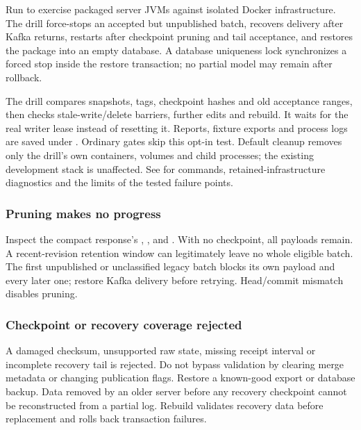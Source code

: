 Run  to exercise packaged server
JVMs against isolated Docker infrastructure. The drill force-stops an accepted
but unpublished batch, recovers delivery after Kafka returns, restarts after
checkpoint pruning and tail acceptance, and restores the package into an empty
database. A database uniqueness lock synchronizes a forced stop inside the
restore transaction; no partial model may remain after rollback.

The drill compares snapshots, tags, checkpoint hashes and old acceptance
ranges, then checks stale-write/delete barriers, further edits and rebuild.
It waits for the real writer lease instead of resetting it. Reports, fixture
exports and process logs are saved under
. Ordinary gates skip this
opt-in test. Default cleanup removes only the drill's own containers, volumes
and child processes; the existing development stack is unaffected. See
 for commands, retained-infrastructure
diagnostics and the limits of the tested failure points.

\subsubsection{Pruning makes no progress}

Inspect the compact response's , ,
 and . With no checkpoint,
all payloads remain. A recent-revision retention window can legitimately
leave no whole eligible batch. The first unpublished or unclassified legacy
batch blocks its own payload and every later one; restore Kafka delivery
before retrying. Head/commit mismatch disables pruning.

\subsubsection{Checkpoint or recovery coverage rejected}

A damaged checksum, unsupported raw state, missing receipt interval or
incomplete recovery tail is rejected. Do not bypass validation by clearing
merge metadata or changing publication flags. Restore a known-good export or
database backup. Data removed by an older server before any recovery checkpoint
cannot be reconstructed from a partial log. Rebuild validates recovery data
before replacement and rolls back transaction failures.

